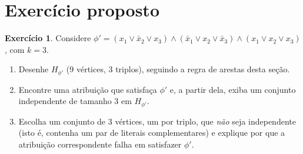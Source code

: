 \documentclass[9pt,a4paper]{extarticle}
\theoremstyle{definition}
\newtheorem{exercise}{Exercício}[section]
\begin{document}
\section{Exercício proposto}

\begin{exercise}
Considere \(\phi' = (x_1 \vee \bar x_2 \vee x_3) \wedge (\bar x_1 \vee x_2 \vee \bar x_3) \wedge (x_1 \vee x_2 \vee x_3)\), com \(k=3\).
\begin{enumerate}[label=(\alph*)]
\item Desenhe \(H_{\phi'}\) (9 vértices, 3 triplos), seguindo a regra de arestas desta seção.
\item Encontre uma atribuição que satisfaça \(\phi'\) e, a partir dela, exiba um conjunto independente de tamanho 3 em \(H_{\phi'}\).
\item Escolha um conjunto de 3 vértices, um por triplo, que \emph{não} seja independente (isto é, contenha um par de literais complementares) e explique por que a atribuição correspondente falha em satisfazer \(\phi'\).
\end{enumerate}
\end{exercise}
\end{document}
